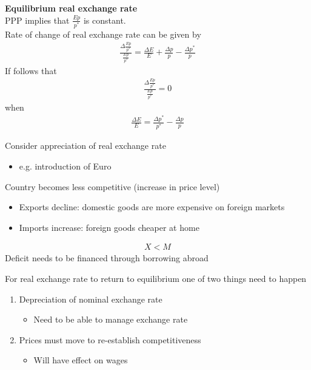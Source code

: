 \documentclass{beamer}
\begin{document}
\begin{frame}
  \textbf{Equilibrium real exchange rate}\\
  PPP implies that $\frac{Ep}{p^*}$ is constant.\\
  Rate of change of real exchange rate can be given by
  \begin{align}
    \frac{\Delta \frac{Ep}{p^*}}{\frac{Ep}{p^*}}=  \frac{\Delta E}{E} + \frac{\Delta p}{p} - \frac{\Delta p^*}{p}
  \end{align}
  If follows that
  \begin{align}
    \frac{\Delta \frac{Ep}{p^*}}{\frac{Ep}{p^*}}=0
  \end{align}
  when
  \begin{align}
    \frac{\Delta E}{E} = \frac{\Delta p^*}{p^*} - \frac{\Delta p}{p}
  \end{align}
\end{frame}


\begin{frame}   
  Consider appreciation of real exchange rate
  \begin{itemize}
    \item e.g. introduction of Euro
  \end{itemize}
  \medskip
  Country becomes less competitive (increase in price level)
  \begin{itemize}
    \item Exports decline: domestic goods are more expensive on foreign markets
    \item Imports increase: foreign goods cheaper at home
  \end{itemize}
  \begin{align}
    X<M
  \end{align}
  \medskip
  Deficit needs to be financed through borrowing abroad  
\end{frame}

\begin{frame}
  For real exchange rate to return to equilibrium one of two things need to happen
  \medskip
  \begin{enumerate}
    \item Depreciation of nominal exchange rate
    \begin{itemize}
      \item Need to be able to manage exchange rate
    \end{itemize}
    \medskip
    \item Prices must move to re-establish competitiveness
    \begin{itemize}
      \item Will have effect on wages
    \end{itemize}
  \end{enumerate}
\end{frame}
\end{document}
